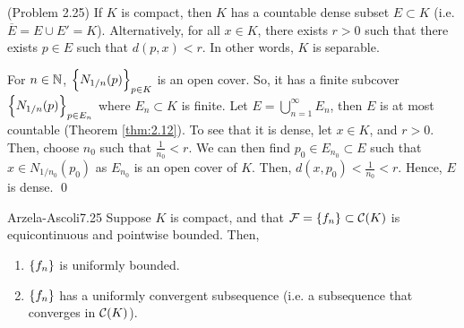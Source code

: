 \begin{nlemma}{ (Problem 2.25)}{}
    If $K$ is compact, then $K$ has a countable dense subset $E \subset K$ (i.e. $\overline{E} = E \cup E' = K$). Alternatively, for all $x \in K$, there exists $r > 0$ such that there exists $p \in E$ such that $d(p, x) < r$. In other words, $K$ is separable. 
\end{nlemma}

\begin{nproof}
    For $n \in \mathbb{N}$, $\set{N_{1/n}(p)}_{p \in K}$ is an open cover. So, it has a finite subcover $\set{N_{1/n}(p)}_{p \in E_n}$ where $E_n \subset K$ is finite. Let $E = \bigcup_{n=1}^\infty E_n$, then $E$ is at most countable (Theorem \ref{thm:2.12}). To see that it is dense, let $x \in K$, and $r > 0$. Then, choose $n_0$ such that $\frac{1}{n_0} < r$. We can then find $p_0 \in E_{n_0} \subset E$ such that $x \in N_{1/n_0}(p_0)$ as $E_{n_0}$ is an open cover of $K$. Then, $d(x, p_0) < \frac{1}{n_0} < r$. Hence, $E$ is dense. \qed
\end{nproof}

\setcounter{rudin}{24}
\begin{theorem}{Arzela-Ascoli}{7.25}
    Suppose $K$ is compact, and that $\mathcal{F} = \set{f_n} \subset \mathcal{C}(K)$ is equicontinuous and pointwise bounded. Then,
    \begin{enumerate}
        \item $\set{f_n}$ is uniformly bounded.
        \item $\set{f_n}$ has a uniformly convergent subsequence (i.e. a subsequence that converges in $\mathcal{C}(K)$).
    \end{enumerate}
\end{theorem}

